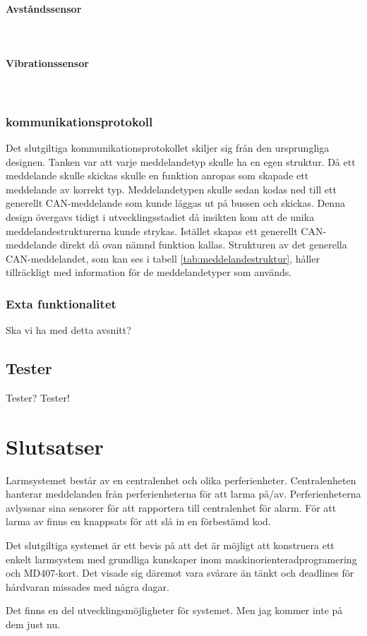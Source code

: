 \documentclass[a4paper]{article}
\newcommand{\todo}[1]{\marginpar{TODO: #1}\vspace{1cm}}
\newcommand{\subsubsubsection}[1]{\paragraph{#1}\mbox{}\\}
\begin{document}
\subsubsubsection{Avståndssensor}
\todo{}

\subsubsubsection{Vibrationssensor}

\subsubsection{kommunikationsprotokoll}
Det slutgiltiga kommunikationsprotokollet skiljer sig från den ursprungliga designen.
Tanken var att varje meddelandetyp skulle ha en egen struktur.
Då ett meddelande skulle skickas skulle en funktion anropas som skapade ett meddelande av korrekt typ.
Meddelandetypen skulle sedan kodas ned till ett generellt CAN-meddelande som kunde läggas ut på bussen och skickas.
Denna design övergavs tidigt i utvecklingsstadiet då insikten kom att de unika meddelandestrukturerna kunde strykas.
Istället skapas ett generellt CAN-meddelande direkt då ovan nämnd funktion kallas.
Strukturen av det generella CAN-meddelandet, som kan ses i tabell \ref{tab:meddelandestruktur}, håller tillräckligt med information för de meddelandetyper som används.


\subsubsection{Exta funktionalitet}
Ska vi ha med detta avsnitt?

\subsection{Tester}
Tester? Tester!


\section{Slutsatser}
Larmsystemet består av en centralenhet och olika perferienheter. Centralenheten hanterar meddelanden från perferienheterna för att larma på/av. Perferienheterna avlyssnar sina sensorer för att rapportera till centralenhet för alarm. För att larma av finns en knappsats för att slå in en förbestämd kod.



Det slutgiltiga systemet är ett bevis på att det är möjligt att konstruera ett enkelt larmsystem med grundliga kunskaper inom maskinorienteradprogramering och MD407-kort. Det visade sig däremot vara svårare än tänkt och deadlines för hårdvaran missades med några dagar.

Det finns en del utvecklingsmöjligheter för systemet. Men jag kommer inte på dem just nu.




\end{document}
